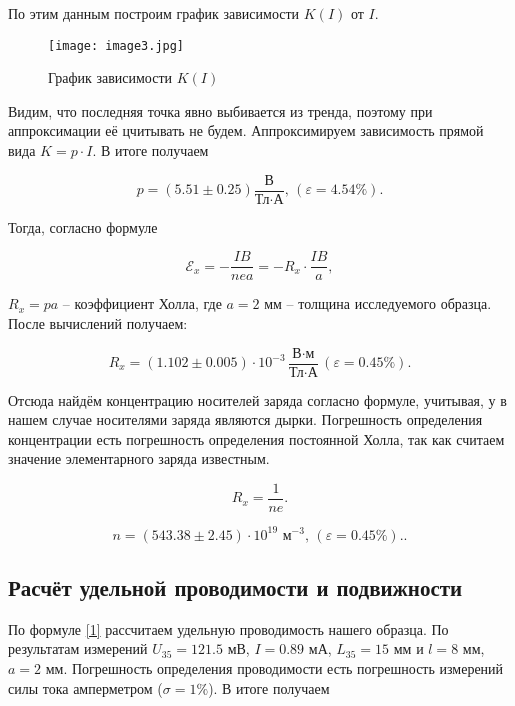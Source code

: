 \documentclass[a4paper,12pt]{article} %
\begin{document}
По этим данным построим график зависимости $ K(I) $ от $ I $.

\begin{figure}[h]
    \begin{center}
		\texttt{[image: image3.jpg]}
    \end{center}
	\caption{График зависимости $ K(I) $}
\label{plot3}
\end{figure}

Видим, что последняя точка явно выбивается из тренда, поэтому при аппроксимации её цчитывать не будем. Аппроксимируем зависимость прямой вида $ K=p\cdot I $. В итоге получаем 

\begin{equation}\label{9}
p = (5.51 \pm 0.25) \frac{\text{В}}{\text{Тл}\cdot\text{А}} \text{, }(\varepsilon = 4.54 \%).
\end{equation}

Тогда, согласно формуле

\[ \mathcal{E}_x = - \frac{IB}{nea} = - R_x \cdot \frac{IB}{a}, \]

$ R_x = pa $ -- коэффициент Холла, где $ a = 2 $ мм -- толщина исследуемого образца. После вычислений получаем:

\begin{equation}\label{10}
\boxed{R_x = (1.102\pm0.005) \cdot 10^{-3} \frac{\text{В}\cdot\text{м}}{\text{Тл}\cdot\text{А}} (\varepsilon = 0.45 \%)}.
\end{equation}

Отсюда найдём концентрацию носителей заряда согласно формуле, учитывая, у в нашем случае носителями заряда являются дырки. Погрешность определения концентрации есть погрешность определения постоянной Холла, так как считаем значение элементарного заряда известным.

\[ R_x=\frac{1}{ne}. \]

\begin{equation}\label{11}
\boxed{n = (543.38\pm2.45) \cdot 10^{19} \text{ м}^{-3}} \text{, }(\varepsilon = 0.45 \%). .
\end{equation}

\subsection{Расчёт удельной проводимости и подвижности}

По формуле \ref{1} рассчитаем удельную проводимость нашего образца. По результатам измерений $ U_{35} = 121.5 $ мВ, $ I = 0.89 $ мА, $ L_{35} = 15 $ мм и $ l = 8 $ мм, $ a = 2$ мм. Погрешность определения проводимости есть погрешность измерений силы тока амперметром ($ \sigma = 1\% $). В итоге получаем 
\end{document}
